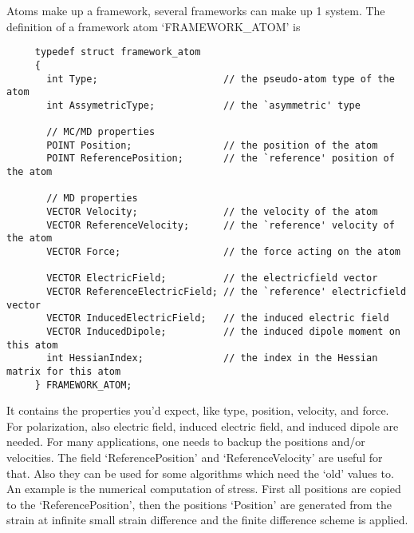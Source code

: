 Atoms make up a framework, several frameworks can make up 1 system. The definition of a framework atom `FRAMEWORK\_ATOM' is
\begin{footnotesize}
\begin{verbatim}
     typedef struct framework_atom
     {  
       int Type;                      // the pseudo-atom type of the atom
       int AssymetricType;            // the `asymmetric' type

       // MC/MD properties
       POINT Position;                // the position of the atom
       POINT ReferencePosition;       // the `reference' position of the atom

       // MD properties
       VECTOR Velocity;               // the velocity of the atom
       VECTOR ReferenceVelocity;      // the `reference' velocity of the atom
       VECTOR Force;                  // the force acting on the atom

       VECTOR ElectricField;          // the electricfield vector
       VECTOR ReferenceElectricField; // the `reference' electricfield vector
       VECTOR InducedElectricField;   // the induced electric field
       VECTOR InducedDipole;          // the induced dipole moment on this atom
       int HessianIndex;              // the index in the Hessian matrix for this atom
     } FRAMEWORK_ATOM;
\end{verbatim}
\end{footnotesize}
It contains the properties you'd expect, like type, position, velocity, and force. For polarization, also electric field, induced electric field, 
and induced dipole are needed. For many applications, one needs to backup the positions and/or velocities. The field `ReferencePosition' and `ReferenceVelocity'
are useful for that. Also they can be used for some algorithms which need the `old' values to. An example is the numerical computation of stress. First all
positions are copied  to the `ReferencePosition', then the positions `Position' are generated from the strain at infinite small strain difference and the
finite difference scheme is applied.

